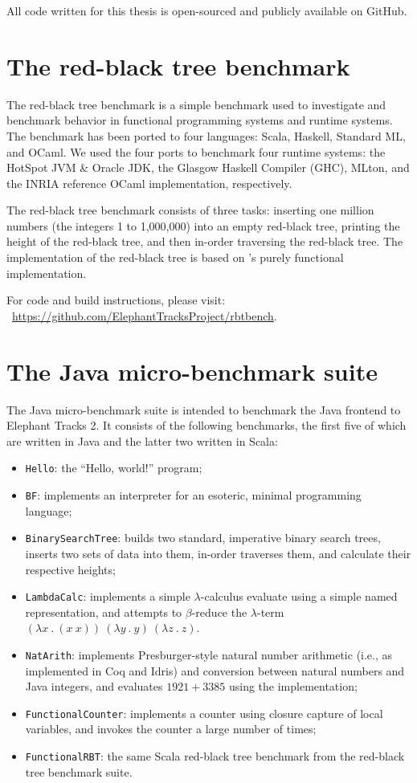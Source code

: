 All code written for this thesis is open-sourced and publicly available on GitHub.

\section{The red-black tree benchmark}
The red-black tree benchmark is a simple benchmark used to investigate and benchmark behavior in functional programming
systems and runtime systems. The benchmark has been ported to four languages: Scala, Haskell, Standard ML, and OCaml. We
used the four ports to benchmark four runtime systems: the HotSpot JVM \& Oracle JDK, the Glasgow Haskell Compiler (GHC),
MLton, and the INRIA reference OCaml implementation, respectively.

The red-black tree benchmark consists of three tasks: inserting one million numbers (the integers 1 to 1,000,000) into
an empty red-black tree, printing the height of the red-black tree, and then in-order traversing the red-black tree. The
implementation of the red-black tree is based on \cite{PFDS}'s purely functional implementation.

For code and build instructions, please visit: ~\url{https://github.com/ElephantTracksProject/rbtbench}.

\section{The Java micro-benchmark suite}
The Java micro-benchmark suite is intended to benchmark the Java frontend to Elephant Tracks 2. It consists of the
following benchmarks, the first five of which are written in Java and the latter two written in Scala:
\begin{itemize}
\item \lstinline{Hello}: the ``Hello, world!'' program;
\item \lstinline{BF}: implements an interpreter for an esoteric, minimal programming language;
\item \lstinline{BinarySearchTree}: builds two standard, imperative binary search trees, inserts two sets of data into them,
in-order traverses them, and calculate their respective heights;
\item \lstinline{LambdaCalc}: implements a simple $\lambda$-calculus evaluate using a simple named representation, and attempts
to $\beta$-reduce the $\lambda$-term \newline $(\lambda x \ . \ (x \ x)) \ (\lambda y \ . \ y) \ (\lambda z \ . \ z)$.
\item \lstinline{NatArith}: implements Presburger-style natural number arithmetic (i.e., as implemented in Coq and Idris) and
conversion between natural numbers and Java integers, and evaluates $1921 + 3385$ using the implementation;
\item \lstinline{FunctionalCounter}: implements a counter using closure capture of local variables, and invokes the counter
a large number of times;
\item \lstinline{FunctionalRBT}: the same Scala red-black tree benchmark from the red-black tree benchmark suite.
\end{itemize}

